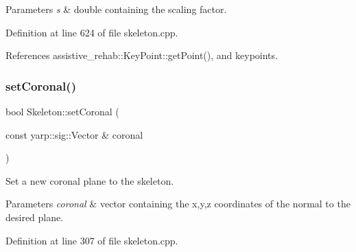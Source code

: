 \begin{DoxyParams}{Parameters}
{\em s} & double containing the scaling factor. \\
\hline
\end{DoxyParams}


Definition at line 624 of file skeleton.\+cpp.


\begin{DoxyCode}{0}

\end{DoxyCode}


References assistive\+\_\+rehab\+::\+Key\+Point\+::get\+Point(), and keypoints.

\mbox{\label{classassistive__rehab_1_1Skeleton_ab3bd697f48ea69cfdc5ff7574c19041f}} 
\subsubsection{\texorpdfstring{setCoronal()}{setCoronal()}}
{\footnotesize\ttfamily bool Skeleton\+::set\+Coronal (\begin{DoxyParamCaption}\item[{const yarp\+::sig\+::\+Vector \&}]{coronal }\end{DoxyParamCaption})}



Set a new coronal plane to the skeleton. 


\begin{DoxyParams}{Parameters}
{\em coronal} & vector containing the x,y,z coordinates of the normal to the desired plane. \\
\hline
\end{DoxyParams}


Definition at line 307 of file skeleton.\+cpp.


\begin{DoxyCode}{0}

\end{DoxyCode}


